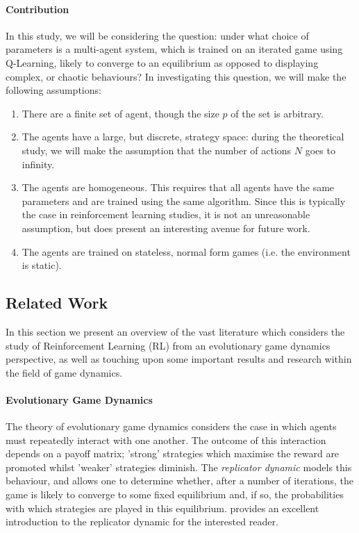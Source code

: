 \documentclass[sigconf]{aamas}
\begin{document}
\paragraph{Contribution}
In this study, we will be considering the question: under what choice of parameters is a
multi-agent system, which is trained on an iterated game using Q-Learning, likely to converge to an
equilibrium as opposed to displaying complex, or chaotic behaviours? In investigating this question, we will make the
following assumptions:

\begin{enumerate}
    \item There are a finite set of agent, though the size $p$ of the set is arbitrary. 
    \item The agents have a large, but discrete, strategy space: during the theoretical study, we
    will make the assumption that the number of actions $N$ goes to infinity.
    \item The agents are homogeneous. This requires that all agents have the same parameters and are
    trained using the same algorithm. Since this is typically the case in reinforcement learning
    studies, it is not an unreasonable assumption, but does present an interesting avenue for future
    work.
    \item The agents are trained on stateless, normal form games (i.e. the environment is static).
\end{enumerate}


\subsection{Related Work}

In this section we present an overview of the vast literature which considers the study of Reinforcement Learning (RL) from an evolutionary game dynamics perspective, as well as touching upon some important results and research within the field of game dynamics.

\paragraph{Evolutionary Game Dynamics} The theory of evolutionary game dynamics \cite{Morgenstern44} considers the case in which agents must repeatedly interact with one another. The outcome of this interaction depends on a payoff matrix; 'strong' strategies which maximise the reward are promoted whilst 'weaker' strategies diminish. The \textit{replicator dynamic} models this behaviour, and allows one to determine whether, after a number of iterations, the game is likely to converge to some fixed equilibrium and, if so, the probabilities with which strategies are played in this equilibrium. \cite{ShohamMultiagentFoundations} provides an excellent introduction to the replicator dynamic for the interested reader.
\end{document}
